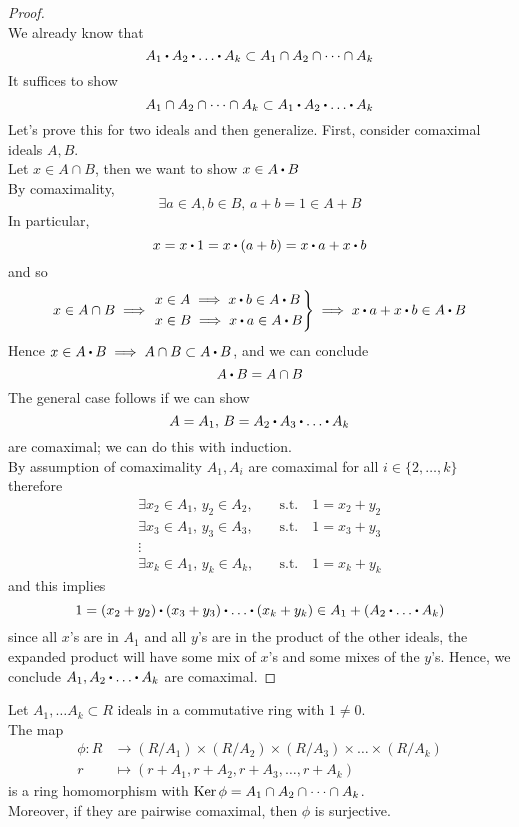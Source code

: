 \documentclass[../Main.tex]{subfiles}
\begin{document}
\begin{proof}~\\
	We already know that
	\[A_1\rdot A_2\rdot \dots \rdot A_k \subset A_1 \cap A_2 \cap \dots \cap A_k\]
	It suffices to show 
	\[A_1 \cap A_2 \cap \dots \cap A_k \subset A_1\rdot A_2\rdot \dots \rdot A_k \]
	Let's prove this for two ideals and then generalize. First, consider comaximal ideals $A,B$.\\
	Let $x\in A\cap B$, then we want to show $x\in A\rdot B$\\
	By comaximality,
	\[\exists a\in A, b\in B, \, a+b =1 \in A+B\]
	In particular,
	\[x=x\rdot 1=x\rdot (a+b)=x\rdot a+x\rdot b\]
	and so
	\[x\in A\cap B \implies \begin{rcases}
	x\in A \implies x\rdot b\in A\rdot B\\
	x\in B\implies x\rdot a \in A\rdot B
	\end{rcases}\implies x\rdot a+x\rdot b\in A\rdot B\]
	Hence $x\in A\rdot B \implies A\cap B \subset A\rdot B$, and we can conclude
	\[A\rdot B = A\cap B\]
	The general case follows if we can show 
	\[A=A_1,\, B=A_2\rdot A_3\rdot \dots\rdot A_k\]
	are comaximal; we can do this with induction.\\
	By assumption of comaximality $A_1,A_i$ are comaximal for all $i\in \{2,\dots,k\}$
	therefore
	\begin{align*}
		\exists x_2\in A_1,\, y_2\in A_2,\quad  &\text{s.t.} \quad 1=x_2+y_2\\\exists x_3\in A_1,\, y_3\in A_3,\quad  &\text{s.t.} \quad 1=x_3+y_3\\
		\vdots&\\
		\exists x_k\in A_1,\, y_k\in A_k,\quad  &\text{s.t.} \quad 1=x_k+y_k
	\end{align*}
	and this implies
	\[1=(x_2+y_2)\rdot (x_3+y_3)\rdot \dots\rdot (x_k+y_k)\in A_1+(A_2\rdot \dots \rdot A_k)\]
	since all $x$'s are in $A_1$ and all $y$'s are in the product of the other ideals, the expanded product will have some mix of $x$'s and some mixes of the $y$'s. Hence, we conclude $A_1, A_2\rdot \dots \rdot A_k$ are comaximal.
\end{proof}
\begin{thm}[title=Chinese Remainder Theorem]
	Let $A_1,\dots A_k\subset R$ ideals in a commutative ring with $1\ne 0$.\\
	The map
	\begin{align*}
	\phi\colon R&\to (R/A_1)\times (R/A_2)\times (R/A_3)\times\dots\times(R/A_k)\\
	r&\mapsto (r+A_1,r+A_2,r+A_3,\dots,r+A_k)
	\end{align*}
	is a ring homomorphism with $\operatorname{Ker}\phi = A_1\cap A_2\cap \dots \cap A_k$.\\
	Moreover, if they are pairwise comaximal, then $\phi$ is surjective.
\end{thm}
\end{document}
